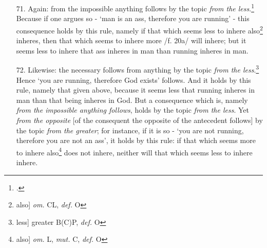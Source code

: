 \begin{itemize}
\item[71.] Again: from the impossible anything follows by the topic \textit{from the less}.\footnote{\cite[p. 61.12]{BurleyDPAL}.} Because if one argues so - `man is an ass, therefore you are running' - this consequence holds by this rule, namely if that which seems less to inhere also\footnote{also] \textit{om.} CL, \textit{def.} O} inheres, then that which seems to inhere more /f. 20a/ will inhere; but it seems less to inhere that ass inheres in man than running inheres in man.
\item[72.] Likewise: the necessary follows from anything by the topic \textit{from the less}.\footnote{less] greater B(C)P, \textit{def.} O} Hence `you are running, therefore God exists' follows. And it holds by this rule, namely that given above, because it seems less that running inheres in man than that being inheres in God. But a consequence which is, namely \textit{from the impossible anything follows}, holds by the topic \textit{from the less}. Yet \textit{from the opposite} [of the consequent the opposite of the antecedent follows] by the topic \textit{from the greater}; for instance, if it is so - `you are not running, therefore you are not an ass', it holds by this rule: if that which seems more to inhere also\footnote{also] \textit{om.} L, \textit{mut.} C, \textit{def.} O} does not inhere, neither will that which seems less to inhere inhere.
\end{itemize}
